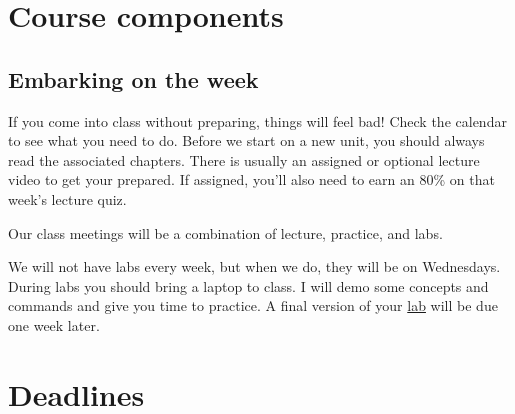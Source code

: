 \documentclass[11pt]{article}
\begin{document}
\hypertarget{course-components}{%
\section*{Course components}\label{course-components}}

\hypertarget{class-meetings-m}{%
\subsection*{Embarking on the week}\label{class-meetings-m}}

If you come into class without preparing, things will feel bad! Check
the calendar to see what you need to do. Before we start on a new unit,
you should always read the associated chapters. There is usually an
assigned or optional lecture video to get your prepared. If assigned,
you'll also need to earn an 80\% on that week's lecture quiz.

Our class meetings will be a combination of lecture, practice, and labs.

We will not have labs every week, but when we do, they will be on
Wednesdays. During labs you should bring a laptop to class. I will demo
some concepts and commands and give you time to practice. A final
version of your \href{/assignment\#labs}{lab} will be due one week
later.

\hypertarget{deadlines-and-extensions}{%
\section*{Deadlines}\label{deadlines-and-extensions}}
\end{document}
